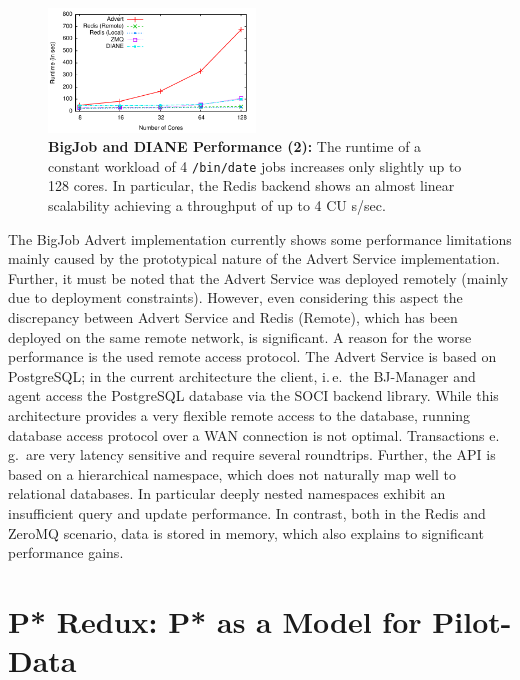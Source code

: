 \documentclass[conference,final]{IEEEtran}
\newcommand{\jhanote}[1]{ {\textcolor{red} { ***shantenu: #1 }}}
\newcommand{\alnote}[1]{ {\textcolor{blue} { ***andre: #1 }}}
\newcommand{\alnote}[1]{}
\newcommand{\jhanote}[1]{}
\newcommand{\cu}{CU\xspace}
\newcommand{\upp}{\vspace*{-0.5em}}
\begin{document}
\begin{figure}[htbp] \centering
\includegraphics[width=0.49\textwidth]{perf/bigjob-varying-cores-alamo.pdf}
\caption{\textbf{BigJob and DIANE Performance (2):}  The
runtime of a constant workload of 4 \texttt{/bin/date} jobs 
increases only slightly up to 128 cores. In particular, the Redis backend shows
an almost linear scalability achieving a throughput of up to 4 \cu s/sec. }
\label{fig:perf_bigjob-varying-cores} 
\upp\upp
\end{figure}

The BigJob Advert implementation currently shows some performance
limitations mainly caused by the prototypical nature of the Advert
Service implementation.  Further, it must be noted that the Advert
Service was deployed remotely (mainly due to deployment
constraints). However, even considering this aspect the discrepancy
between Advert Service and Redis (Remote), which has been deployed on
the same remote network, is significant. A reason for the worse
performance is the used remote access protocol. The Advert Service is
based on PostgreSQL; in the current architecture the client, i.\,e.\
the BJ-Manager and agent access the PostgreSQL database via the SOCI
backend library. While this architecture provides a very flexible
remote access to the database, running database access protocol over a
WAN connection is not optimal. %
Transactions e.\,g.\ are very latency
sensitive and require several roundtrips.  Further, the API is based
on a hierarchical namespace, which does not naturally map well to
relational databases. In particular deeply nested namespaces exhibit
an insufficient query and update performance. In contrast, both in the
Redis and ZeroMQ scenario, data is stored in memory, which also
explains to significant performance gains.

\upp

\section{P* Redux: P* as a Model for Pilot-Data\upp\upp}
\label{sec:pilot-data}
\end{document}
